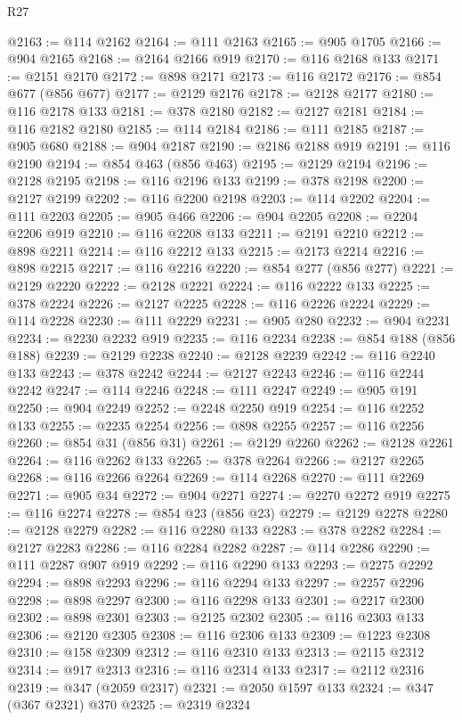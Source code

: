 \begin{lexlean}{R27}
\begin{coremodule}
@2163 := @114 @2162
@2164 := @111 @2163
@2165 := @905 @1705
@2166 := @904 @2165
@2168 := @2164 @2166 @919
@2170 := @116 @2168 @133
@2171 := @2151 @2170
@2172 := @898 @2171
@2173 := @116 @2172
@2176 := @854 @677 (@856 @677)
@2177 := @2129 @2176
@2178 := @2128 @2177
@2180 := @116 @2178 @133
@2181 := @378 @2180
@2182 := @2127 @2181
@2184 := @116 @2182 @2180
@2185 := @114 @2184
@2186 := @111 @2185
@2187 := @905 @680
@2188 := @904 @2187
@2190 := @2186 @2188 @919
@2191 := @116 @2190
@2194 := @854 @463 (@856 @463)
@2195 := @2129 @2194
@2196 := @2128 @2195
@2198 := @116 @2196 @133
@2199 := @378 @2198
@2200 := @2127 @2199
@2202 := @116 @2200 @2198
@2203 := @114 @2202
@2204 := @111 @2203
@2205 := @905 @466
@2206 := @904 @2205
@2208 := @2204 @2206 @919
@2210 := @116 @2208 @133
@2211 := @2191 @2210
@2212 := @898 @2211
@2214 := @116 @2212 @133
@2215 := @2173 @2214
@2216 := @898 @2215
@2217 := @116 @2216
@2220 := @854 @277 (@856 @277)
@2221 := @2129 @2220
@2222 := @2128 @2221
@2224 := @116 @2222 @133
@2225 := @378 @2224
@2226 := @2127 @2225
@2228 := @116 @2226 @2224
@2229 := @114 @2228
@2230 := @111 @2229
@2231 := @905 @280
@2232 := @904 @2231
@2234 := @2230 @2232 @919
@2235 := @116 @2234
@2238 := @854 @188 (@856 @188)
@2239 := @2129 @2238
@2240 := @2128 @2239
@2242 := @116 @2240 @133
@2243 := @378 @2242
@2244 := @2127 @2243
@2246 := @116 @2244 @2242
@2247 := @114 @2246
@2248 := @111 @2247
@2249 := @905 @191
@2250 := @904 @2249
@2252 := @2248 @2250 @919
@2254 := @116 @2252 @133
@2255 := @2235 @2254
@2256 := @898 @2255
@2257 := @116 @2256
@2260 := @854 @31 (@856 @31)
@2261 := @2129 @2260
@2262 := @2128 @2261
@2264 := @116 @2262 @133
@2265 := @378 @2264
@2266 := @2127 @2265
@2268 := @116 @2266 @2264
@2269 := @114 @2268
@2270 := @111 @2269
@2271 := @905 @34
@2272 := @904 @2271
@2274 := @2270 @2272 @919
@2275 := @116 @2274
@2278 := @854 @23 (@856 @23)
@2279 := @2129 @2278
@2280 := @2128 @2279
@2282 := @116 @2280 @133
@2283 := @378 @2282
@2284 := @2127 @2283
@2286 := @116 @2284 @2282
@2287 := @114 @2286
@2290 := @111 @2287 @907 @919
@2292 := @116 @2290 @133
@2293 := @2275 @2292
@2294 := @898 @2293
@2296 := @116 @2294 @133
@2297 := @2257 @2296
@2298 := @898 @2297
@2300 := @116 @2298 @133
@2301 := @2217 @2300
@2302 := @898 @2301
@2303 := @2125 @2302
@2305 := @116 @2303 @133
@2306 := @2120 @2305
@2308 := @116 @2306 @133
@2309 := @1223 @2308
@2310 := @158 @2309
@2312 := @116 @2310 @133
@2313 := @2115 @2312
@2314 := @917 @2313
@2316 := @116 @2314 @133
@2317 := @2112 @2316
@2319 := @347 (@2059 @2317)
@2321 := @2050 @1597 @133
@2324 := @347 (@367 @2321) @370
@2325 := @2319 @2324

\end{coremodule}
\end{lexlean}
